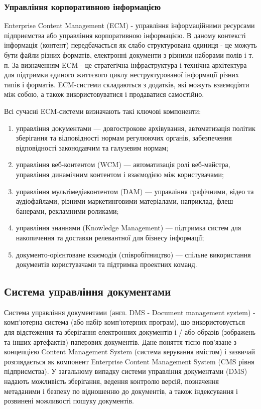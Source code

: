 \subsubsection{Управління корпоративною інформацією}
Enterprise Content Management (ECM) - управління інформаційними ресурсами підприємства або управління корпоративною інформацією.
В даному контексті інформація (контент) передбачається як слабо структурована одиниця - це можуть бути файли різних форматів, електронні документи з різними наборами полів і т. п.
За визначенням ECM - це стратегічна інфраструктура і технічна архітектура для підтримки єдиного життєвого циклу неструктурованої інформації різних типів і форматів. 
ECM-системи складаються з додатків, які можуть взаємодіяти між собою, а також використовуватися і продаватися самостійно. 
\par Всі сучасні ECM-системи визначають такі ключові компоненти:
\begin{enumerate}
\item управління документами --- довгострокове архівування, автоматизація політик зберігання та відповідності нормам регулюючих органів, забезпечення відповідності законодавчим та галузевим нормам;
\item управління веб-контентом (WCM) --- автоматизація ролі веб-майстра, управління динамічним контентом і взаємодією між користувачами;
\item  управління мультімедіаконтентом (DAM) --- управління графічними, відео та аудіофайлами, різними маркетинговими матеріалами, наприклад, флеш-банерами, рекламними роликами;
\item управління знаннями (Knowledge Management) --- підтримка систем для накопичення та доставки релевантної для бізнесу інформації;
\item документо-орієнтоване взаємодія (співробітництво) --- спільне використання документів користувачами та підтримка проектних команд.
\end{enumerate}


\subsection{Система управління документами}
Система управління документами  (англ. DMS - Document management system) - комп'ютерна система (або набір комп'ютерних програм), що використовується для відстеження та зберігання електронних документів і / або образів (зображень та інших артефактів) паперових документів.
Дане поняття тісно пов'язане з концепцією Content Management System (система керування вмістом) і зазвичай розглядається як компонент Enterprise Content Management System (CMS рівня підприємства).
У загальному випадку системи управління документами (DMS) надають можливість зберігання, ведення контролю версій, позначення метаданими і безпеку по відношенню до документів, а також індексування і розвинені можливості пошуку документів.
